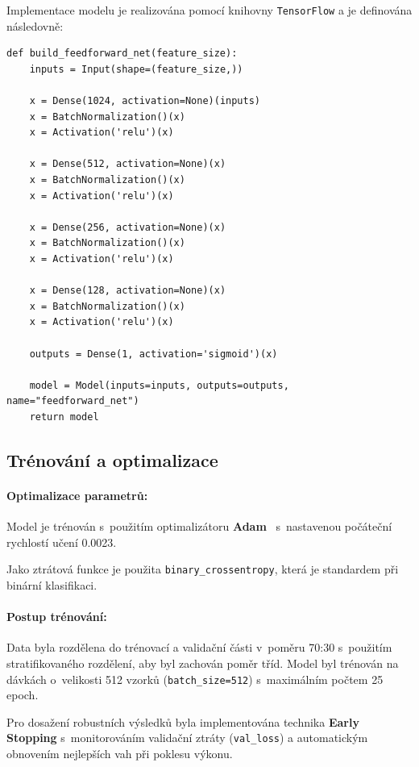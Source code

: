 Implementace modelu je realizována pomocí knihovny \texttt{TensorFlow} a je definována následovně:

\begin{verbatim}
def build_feedforward_net(feature_size):
    inputs = Input(shape=(feature_size,))
    
    x = Dense(1024, activation=None)(inputs)
    x = BatchNormalization()(x)
    x = Activation('relu')(x)
    
    x = Dense(512, activation=None)(x)
    x = BatchNormalization()(x)
    x = Activation('relu')(x)
    
    x = Dense(256, activation=None)(x)
    x = BatchNormalization()(x)
    x = Activation('relu')(x)

    x = Dense(128, activation=None)(x)
    x = BatchNormalization()(x)
    x = Activation('relu')(x)

    outputs = Dense(1, activation='sigmoid')(x)
    
    model = Model(inputs=inputs, outputs=outputs, name="feedforward_net")
    return model
\end{verbatim}

\subsection{Trénování a optimalizace}

\paragraph{Optimalizace parametrů:}
Model je trénován s~použitím optimalizátoru \textbf{Adam}~\cite{kingma2014adam} s~nastavenou počáteční rychlostí učení 0{.}0023.

Jako ztrátová funkce je použita \texttt{binary\_crossentropy}, která je standardem při binární klasifikaci.


\paragraph{Postup trénování:}
Data byla rozdělena do trénovací a validační části v~poměru 70:30 s~použitím stratifikovaného rozdělení, aby byl zachován poměr tříd. Model byl trénován na dávkách o~velikosti 512 vzorků (\texttt{batch\_size=512}) s~maximálním počtem 25 epoch.

Pro dosažení robustních výsledků byla implementována technika \textbf{Early Stopping} s~monitorováním validační ztráty (\texttt{val\_loss}) a automatickým obnovením nejlepších vah při poklesu výkonu.


